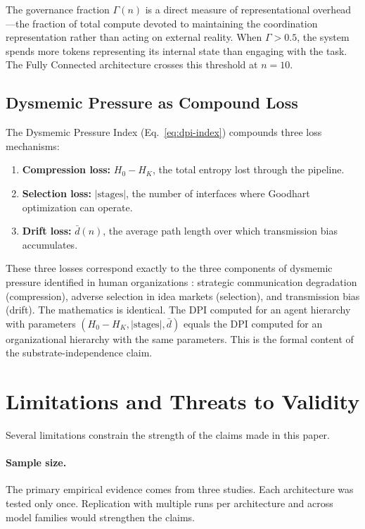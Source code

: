 \documentclass[11pt,a4paper]{article}
\begin{document}
The governance fraction $\Gamma(n)$ is a direct measure of representational overhead---the fraction of total compute devoted to maintaining the coordination representation rather than acting on external reality. When $\Gamma > 0.5$, the system spends more tokens representing its internal state than engaging with the task. The Fully Connected architecture crosses this threshold at $n = 10$.

\subsection{Dysmemic Pressure as Compound Loss}

The Dysmemic Pressure Index (Eq.~\ref{eq:dpi-index}) compounds three loss mechanisms:
\begin{enumerate}
\item \textbf{Compression loss:} $H_0 - H_K$, the total entropy lost through the pipeline.
\item \textbf{Selection loss:} $|\text{stages}|$, the number of interfaces where Goodhart optimization can operate.
\item \textbf{Drift loss:} $\bar{d}(n)$, the average path length over which transmission bias accumulates.
\end{enumerate}

These three losses correspond exactly to the three components of dysmemic pressure identified in human organizations \citep{mcentire2025a}: strategic communication degradation (compression), adverse selection in idea markets (selection), and transmission bias (drift). The mathematics is identical. The DPI computed for an agent hierarchy with parameters $(H_0 - H_K, |\text{stages}|, \bar{d})$ equals the DPI computed for an organizational hierarchy with the same parameters. This is the formal content of the substrate-independence claim.


\section{Limitations and Threats to Validity}
\label{sec:limitations}

Several limitations constrain the strength of the claims made in this paper.

\paragraph{Sample size.} The primary empirical evidence comes from three studies. Each architecture was tested only once. Replication with multiple runs per architecture and across model families would strengthen the claims.
\end{document}
